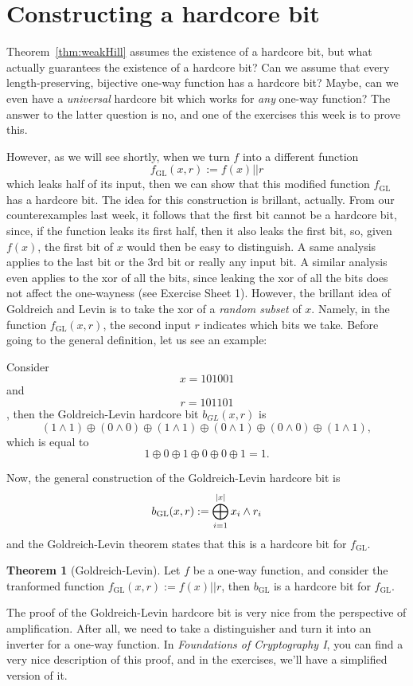 \documentclass[a4paper,table,dvipsnames]{article}
\theoremstyle{definition}
\newtheorem*{theorem}{Theorem}
\begin{document}
\section{Constructing a hardcore bit}
Theorem~\ref{thm:weakHill} assumes the existence of a hardcore bit, but what actually guarantees
the existence of a hardcore bit? Can we assume that every length-preserving, bijective one-way
function has a hardcore bit? Maybe, can we even have a \emph{universal} hardcore bit which
works for \emph{any} one-way function? The answer to the latter question is no, and one of the
exercises this week is to prove this.

However, as we will see shortly, when we turn $f$ into a different function
\[f_{\text{GL}}(x,r):=f(x)||r\]
which leaks half of its input, then we can show that this modified function $f_{\text{GL}}$
has a hardcore bit. The idea for this construction is brillant, actually. From our counterexamples
last week, it follows that the first bit cannot be a hardcore bit, since, if the function leaks
its first half, then it also leaks the first bit, so, given $f(x)$, the first bit of $x$ would then
be easy to distinguish. A same analysis applies to the last bit or the 3rd bit or really any input
bit. A similar analysis even applies to the xor of all the bits, since leaking the xor of all the
bits does not affect the one-wayness (see Exercise Sheet 1). However, the brillant idea of Goldreich
and Levin is to take the xor of a \emph{random subset} of $x$. Namely, in the function $f_{\text{GL}}(x,r)$,
the second input $r$ indicates which bits we take. Before going to the general definition, let
us see an example:


Consider $$x=101001$$ and $$ r=101101$$, then the Goldreich-Levin hardcore bit $b_{GL}(x,r)$ is
\[(1\wedge 1) \oplus (0\wedge 0) \oplus (1\wedge 1) \oplus (0\wedge 1) \oplus (0\wedge 0) \oplus (1\wedge 1),\]
which is equal to
\[1  \oplus 0 \oplus 1 \oplus 0 \oplus 0 \oplus 1=1.\]

Now, the general construction of the Goldreich-Levin hardcore bit is
\[b_{\text{GL}}(x,r):=\bigoplus_{i=1}^{\left\lvert x\right\rvert}x_i\wedge r_i\]
and the Goldreich-Levin theorem states that this is a hardcore bit for $f_{\text{GL}}$.

\begin{theorem}[Goldreich-Levin]
Let $f$ be a one-way function, and consider the tranformed function $f_{\text{GL}}(x,r):=f(x)||r$,
then $b_{\text{GL}}$ is a hardcore bit for $f_{\text{GL}}$.
\end{theorem}
The proof of the Goldreich-Levin hardcore bit is very nice from the perspective of amplification.
After all, we need to take a distinguisher and turn it into an inverter for a one-way function.
In \emph{Foundations of Cryptography I}, you can find a very nice description of this proof, and
in the exercises, we'll have a simplified version of it.
\end{document}
